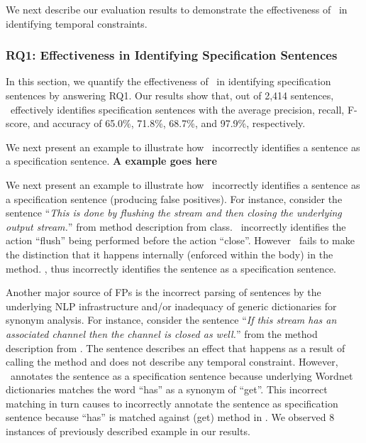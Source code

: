 We next describe our evaluation results to demonstrate the effectiveness of \tool\ in identifying temporal constraints.

\subsubsection{RQ1: Effectiveness in Identifying Specification Sentences}


In this section, we quantify the effectiveness of \tool\ in identifying specification sentences by answering RQ1. Our results show that, out of 2,414 sentences, \tool\ effectively identifies specification sentences with the average precision, recall, F-score, and accuracy of 65.0\%, 71.8\%, 68.7\%, and 97.9\%, respectively.

We next present an example to illustrate how \tool\ incorrectly identifies a sentence as a specification sentence. \textbf{A example goes here}

We next present an example to illustrate how \tool\ incorrectly identifies a sentence as a specification sentence (producing false positives). For instance, consider the sentence ``\textit{This is done by flushing the stream and then closing the underlying output stream.}'' from   method description from  class. \tool\ incorrectly identifies the action ``flush'' being performed before the action ``close''. However \tool\ fails to make the distinction that it happens internally (enforced within the body) in the method. \tool, thus incorrectly identifies the sentence as a specification sentence.   


Another major source of FPs is the incorrect parsing of sentences by the underlying NLP infrastructure and/or inadequacy of generic dictionaries for synonym analysis. For instance, consider the sentence ``\textit{If this stream has an associated channel then the channel is closed as well.}'' from the  method description from . The sentence describes an effect that happens as a result of calling the  method and does not describe any temporal constraint. However, \tool\ annotates the sentence as a specification sentence because underlying Wordnet dictionaries matches the word ``has'' as a synonym of ``get''. This incorrect matching in turn causes \tool to incorrectly annotate the sentence as specification sentence because ``has'' is matched against \CodeIn(get) method in . We observed 8 instances of previously described example in our results.

